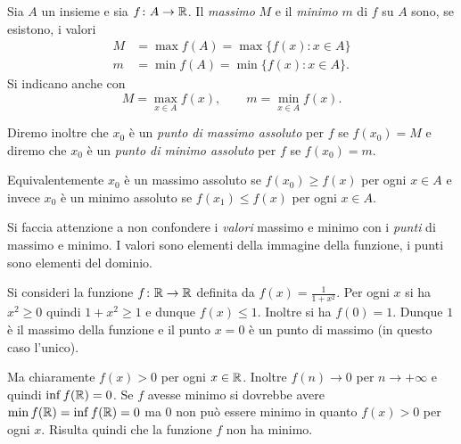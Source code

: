 \begin{definition}
\mymark{**}
Sia $A$ un insieme e sia $f\colon A \to \mathbb R$.
Il \emph{massimo} $M$ e il \emph{minimo} $m$
%
%
%
di $f$ su $A$ sono,
se esistono, i valori
\begin{align*}
  M &= \max f(A) = \max\{f(x)\colon x \in A\} \\
  m &= \min f(A) = \min\{f(x)\colon x \in A\}.
\end{align*}
Si indicano anche con
\mymargin{$\max$, $\min$}
\index{$\max$}
\index{$\min$}
\[
  M = \max_{x\in A} f(x), \qquad m = \min_{x\in A} f(x).
\]

Diremo inoltre che $x_0$ è un \emph{punto di massimo assoluto}
per $f$ se $f(x_0) = M$ e diremo che $x_0$ è un \emph{punto di minimo assoluto} per $f$ se $f(x_0) = m$.

Equivalentemente $x_0$ è un massimo assoluto se $f(x_0) \ge f(x)$ per ogni $x\in A$ e invece $x_0$ è un minimo assoluto se $f(x_1) \le f(x)$ per ogni $x\in A$.
\end{definition}

Si faccia attenzione a non confondere i \emph{valori} massimo e minimo con i \emph{punti} di massimo e minimo. I valori sono elementi della immagine della funzione, i punti sono elementi del dominio.

\begin{example}
Si consideri la funzione $f\colon \mathbb R \to \mathbb R$ definita da $f(x) = \frac{1}{1+x^2}$.
Per ogni $x$ si ha $x^2\ge 0$ quindi $1+x^2\ge 1$ e dunque $f(x)\le 1$.
Inoltre si ha $f(0)=1$. Dunque $1$ è il massimo della funzione
e il punto $x=0$ è un punto di massimo (in questo caso l'unico).

Ma chiaramente $f(x)>0$ per ogni $x\in \mathbb R$.
Inoltre $f(n) \to 0$ per $n\to +\infty$ e quindi $\inf f(\mathbb R) = 0$.
Se $f$ avesse minimo si dovrebbe avere $\min f(\mathbb R) = \inf f(\mathbb R) = 0$ ma $0$ non può essere minimo in quanto $f(x) >0$ per ogni $x$.
Risulta quindi che la funzione $f$ non ha minimo.
\end{example}

